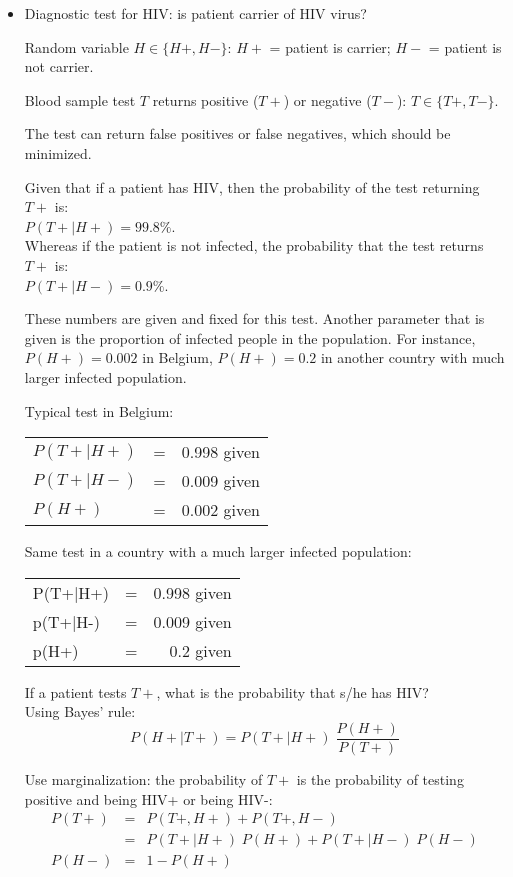 \begin{itemize}
\item Diagnostic test for HIV: is patient carrier of HIV virus?

Random variable $H \in \{ H+, H- \}$:
  $H+$ = patient is carrier;
  $H-$ = patient is not carrier.

Blood sample test $T$ returns positive ($T+$) or negative ($T-$):
$T \in \{ T+, T- \}$.

The test can return false positives or false negatives, which should be minimized.

Given that if a patient has HIV, then the probability of the test returning $T+$ is: \\
$P(T+|H+) = 99.8 \%$. \\
Whereas if the patient is not infected, the probability that the test returns $T+$ is: \\
$P(T+|H-) = 0.9 \%$.

These numbers are given and fixed for this test. Another parameter that is given is the proportion of infected people in the population. For instance, $P(H+) = 0.002$ in Belgium, $P(H+) = 0.2$ in another country with much larger infected population.

Typical test in Belgium:
\begin{center}
\begin{tabular}{lcr}
$P(T+|H+)$ & = & 0.998 given \\
$P(T+|H-)$ & = & 0.009 given \\
$P(H+)$    & = & 0.002 given
\end{tabular}
\end{center}

Same test in a country with a much larger infected population:
\begin{center}
\begin{tabular}{lcr}
P(T+|H+) & = & 0.998 given \\
p(T+|H-) & = & 0.009 given \\
p(H+)    & = & 0.2   given
\end{tabular}
\end{center}

If a patient tests $T+$, what is the probability that s/he has HIV? \\
Using Bayes' rule:
\begin{equation}
P(H+|T+) = P(T+|H+) \; \frac{P(H+)}{P(T+)}
\end{equation}

Use marginalization: the probability of $T+$ is the probability of testing positive and being HIV+ or being HIV-:
\begin{eqnarray}
P(T+) & = & P(T+,H+) + P(T+,H-) \\
      & = & P(T+|H+) \; P(H+) + P(T+|H-) \; P(H-) \\
P(H-) & = & 1 - P(H+)
\end{eqnarray}


\end{itemize}
